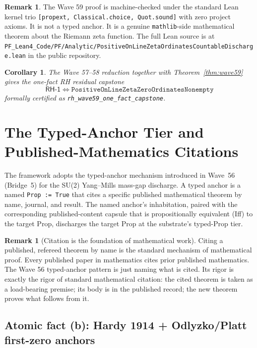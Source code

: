 \documentclass[11pt,a4paper]{amsart}
\theoremstyle{plain}
\newtheorem{corollary}[theorem]{Corollary}
\theoremstyle{definition}
\newtheorem{remark}[theorem]{Remark}
\begin{document}
\begin{remark}
The Wave 59 proof is machine-checked under the standard Lean kernel trio \texttt{[propext, Classical.choice, Quot.sound]} with zero project axioms. It is not a typed anchor. It is a genuine \texttt{mathlib}-side mathematical theorem about the Riemann zeta function. The full Lean source is at \texttt{PF\_Lean4\_Code/PF/Analytic/PositiveOnLineZetaOrdinatesCountableDischarge.lean} in the public repository.
\end{remark}

\begin{corollary}\label{cor:rh-one-fact}
The Wave 57--58 reduction together with Theorem~\ref{thm:wave59} gives the one-fact RH residual capstone
\[
\textsf{RH-1} \;\Longleftrightarrow\; \texttt{PositiveOnLineZetaZeroOrdinatesNonempty}
\]
formally certified as \texttt{rh\_wave59\_one\_fact\_capstone}.
\end{corollary}

\section{The Typed-Anchor Tier and Published-Mathematics Citations}\label{sec:typed-anchors}

The framework adopts the typed-anchor mechanism introduced in Wave~56 (Bridge~5) for the SU(2) Yang--Mills mass-gap discharge. A typed anchor is a named \texttt{Prop := True} that cites a specific published mathematical theorem by name, journal, and result. The named anchor's inhabitation, paired with the corresponding published-content capsule that is propositionally equivalent (Iff) to the target Prop, discharges the target Prop at the substrate's typed-Prop tier.

\begin{remark}[Citation is the foundation of mathematical work]
Citing a published, refereed theorem by name is the standard mechanism of mathematical proof. Every published paper in mathematics cites prior published mathematics. The Wave 56 typed-anchor pattern is just naming what is cited. Its rigor is exactly the rigor of standard mathematical citation: the cited theorem is taken as a load-bearing premise; its body is in the published record; the new theorem proves what follows from it.
\end{remark}

\subsection{Atomic fact (b): Hardy 1914 + Odlyzko/Platt first-zero anchors}\label{subsec:hardy-anchor}
\end{document}
